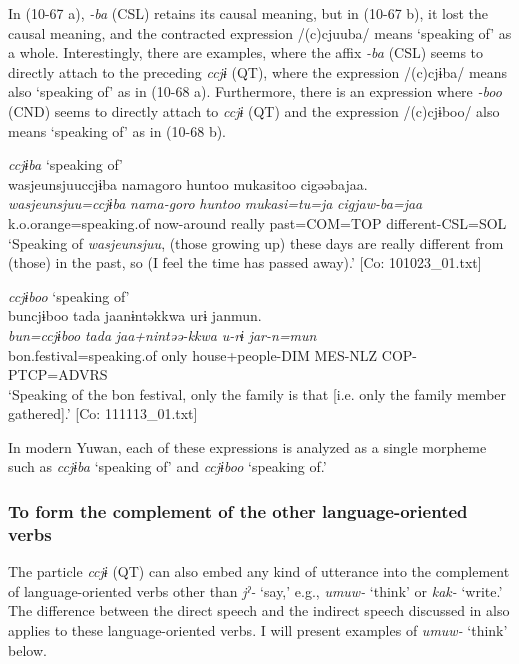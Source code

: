 \begin{xlist}
In (10-67 a), \textit{{}-ba} (CSL) retains its causal meaning, but in (10-67 b), it lost the causal meaning, and the contracted expression /(c)cjuuba/ means ‘speaking of’ as a whole. Interestingly, there are examples, where the affix \textit{{}-ba} (CSL) seems to directly attach to the preceding \textit{ccjɨ} (QT), where the expression /(c)cjɨba/ means also ‘speaking of’ as in (10-68 a). Furthermore, there is an expression where \textit{{}-boo} (CND) seems to directly attach to \textit{ccjɨ} (QT) and the expression /(c)cjɨboo/ also means ‘speaking of’ as in (10-68 b).

\ea\label{ex:10.68}
\ea \textit{ccjɨba} ‘speaking of’\\
      \glll    {\textbar}wasjeunsjuu{\textbar}ccjɨba  nama{\textbar}goro{\textbar}  huntoo  mukasitoo  cigəəbajaa.\\
    \textit{wasjeunsjuu=ccjɨba}  \textit{nama-goro}  \textit{huntoo}  \textit{mukasi=tu=ja}  \textit{cigjaw-ba=jaa}\\
    k.o.orange=speaking.of  now-around  really  past=COM=TOP  different-CSL=SOL\\
\glt     ‘Speaking of \textit{wasjeunsjuu}, (those growing up) these days are really different from (those) in the past, so (I feel the time has passed away).’  [Co: 101023\_01.txt]

  \ex \textit{ccjɨboo} ‘speaking of’\\
      \glll    buncjɨboo  {\textbar}tada{\textbar}  jaanɨntəkkwa  urɨ  janmun.\\
    \textit{bun=ccjɨboo}  \textit{tada}  \textit{jaa+nintəə-kkwa}  \textit{u-rɨ}  \textit{jar-n=mun}\\
    bon.festival=speaking.of  only  house+people{}-DIM  MES-NLZ  COP-PTCP=ADVRS\\
    \glt     ‘Speaking of the bon festival, only the family is that [i.e. only the family member gathered].’  [Co: 111113\_01.txt]
    \z
\z

In modern Yuwan, each of these expressions is analyzed as a single morpheme such as \textit{ccjɨba} ‘speaking of’ and \textit{ccjɨboo} ‘speaking of.’

\subsubsection{To form the complement of the other language-oriented verbs}\label{sec:10.4.1.2}

The particle \textit{ccjɨ} (QT) can also embed any kind of utterance into the complement of language-oriented verbs other than \textit{jˀ-} ‘say,’ e.g., \textit{umuw-} ‘think’ or \textit{kak-} ‘write.’ The difference between the direct speech and the indirect speech discussed in  also applies to these language-oriented verbs. I will present examples of \textit{umuw-} ‘think’ below.


\end{xlist}
